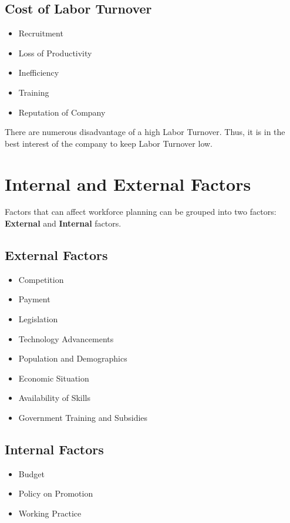 \documentclass{standalone}
\begin{document}
\subsection{Cost of Labor Turnover}
\begin{itemize}
	\item Recruitment
	\item Loss of Productivity
	\item Inefficiency
	\item Training
	\item Reputation of Company
\end{itemize}

There are numerous disadvantage of a high Labor Turnover.
Thus, it is in the best interest of the company to keep Labor Turnover low.

\section{Internal and External Factors}

Factors that can affect workforce planning can be grouped into two factors: \textbf{External} and \textbf{Internal} factors.

\subsection{External Factors}
\begin{itemize}
	\item Competition
	\item Payment
	\item Legislation
	\item Technology Advancements
	\item Population and Demographics
	\item Economic Situation
	\item Availability of Skills
	\item Government Training and Subsidies
\end{itemize}

\subsection{Internal Factors}
\begin{itemize}
	\item Budget
	\item Policy on Promotion
	\item Working Practice
\end{itemize}
\end{document}
